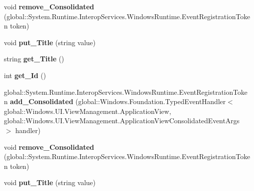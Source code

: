 \begin{DoxyCompactItemize}
void {\bfseries remove\+\_\+\+Consolidated} (global\+::\+System.\+Runtime.\+Interop\+Services.\+Windows\+Runtime.\+Event\+Registration\+Token token)
\item 
\mbox{\label{interface_windows_1_1_u_i_1_1_view_management_1_1_i_application_view_a92d3277e8c30de745cb16c868d726dd6}} 
void {\bfseries put\+\_\+\+Title} (string value)
\item 
\mbox{\label{interface_windows_1_1_u_i_1_1_view_management_1_1_i_application_view_a8cf31a988ee9afab65de9ee57bad61ac}} 
string {\bfseries get\+\_\+\+Title} ()
\item 
\mbox{\label{interface_windows_1_1_u_i_1_1_view_management_1_1_i_application_view_a085241cde891f43041555e966151192b}} 
int {\bfseries get\+\_\+\+Id} ()
\item 
\mbox{\label{interface_windows_1_1_u_i_1_1_view_management_1_1_i_application_view_ab9e4087fb6ff5d554c2307d00530d07b}} 
global\+::\+System.\+Runtime.\+Interop\+Services.\+Windows\+Runtime.\+Event\+Registration\+Token {\bfseries add\+\_\+\+Consolidated} (global\+::\+Windows.\+Foundation.\+Typed\+Event\+Handler$<$ global\+::\+Windows.\+U\+I.\+View\+Management.\+Application\+View, global\+::\+Windows.\+U\+I.\+View\+Management.\+Application\+View\+Consolidated\+Event\+Args $>$ handler)
\item 
\mbox{\label{interface_windows_1_1_u_i_1_1_view_management_1_1_i_application_view_af6ab836962164e5617ab1386c2e02849}} 
void {\bfseries remove\+\_\+\+Consolidated} (global\+::\+System.\+Runtime.\+Interop\+Services.\+Windows\+Runtime.\+Event\+Registration\+Token token)
\item 
\mbox{\label{interface_windows_1_1_u_i_1_1_view_management_1_1_i_application_view_a92d3277e8c30de745cb16c868d726dd6}} 
void {\bfseries put\+\_\+\+Title} (string value)
\item 
\mbox{\label{interface_windows_1_1_u_i_1_1_view_management_1_1_i_application_view_a8cf31a988ee9afab65de9ee57bad61ac}} 

\end{DoxyCompactItemize}
